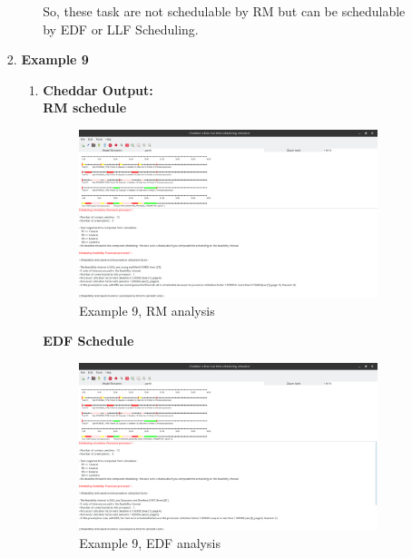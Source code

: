 \documentclass[a4paper,11pt]{article}%
\newenvironment{qanda}{\setlength{\parindent}{0pt}}{\bigskip}
\begin{document}
\begin{qanda}
\begin{enumerate}
\begin{enumerate}
\begin{enumerate}
\begin{enumerate}
						                  So, these task are not schedulable by RM but can be schedulable by EDF or LLF Scheduling.
					            \end{enumerate}
					      \item \textbf{Example 9}
					            \begin{enumerate}
						            \item \textbf{Cheddar Output:}\\
						                  \textbf{RM schedule}
						                  \begin{figure}[H]
							                  \centering
							                  \includegraphics[scale=0.36]{figures/ex9_rm.png}
							                  \caption{Example 9, RM analysis}
						                  \end{figure}
						                  \textbf{EDF Schedule}
						                  \begin{figure}[H]
							                  \centering
							                  \includegraphics[scale=0.36]{figures/ex9_edf.png}
							                  \caption{Example 9, EDF analysis}

\end{figure}
\end{enumerate}
\end{enumerate}
\end{enumerate}
\end{enumerate}
\end{qanda}
\end{document}
